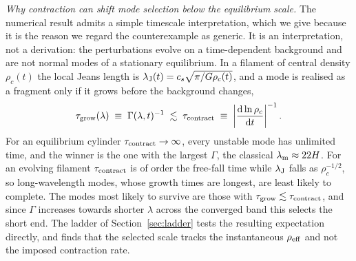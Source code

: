 \documentclass[usenatbib,twoside,twocolumn]{mnras}
\begin{document}
\emph{Why contraction can shift mode selection below the equilibrium scale.} The numerical result admits a simple timescale interpretation, which we give because it is the reason we regard the counterexample as generic. It is an interpretation, not a derivation: the perturbations evolve on a time-dependent background and are not normal modes of a stationary equilibrium. In a filament of central density $\rho_c(t)$ the local Jeans length is $\lambda_{\rm J}(t)=c_s\sqrt{\pi/G\rho_c(t)}$, and a mode is realised as a fragment only if it grows before the background changes,
\begin{equation}
\tau_{\rm grow}(\lambda)\;\equiv\;\Gamma(\lambda,t)^{-1}\;\lesssim\;\tau_{\rm contract}\;\equiv\;\left|\frac{{\rm d}\ln\rho_c}{{\rm d}t}\right|^{-1}.
\label{eq:freezeout}
\end{equation}
For an equilibrium cylinder $\tau_{\rm contract}\to\infty$, every unstable mode has unlimited time, and the winner is the one with the largest $\Gamma$, the classical $\lambda_{\rm m}\approx22H$. For an evolving filament $\tau_{\rm contract}$ is of order the free-fall time while $\lambda_{\rm J}$ falls as $\rho_c^{-1/2}$, so long-wavelength modes, whose growth times are longest, are least likely to complete. The modes most likely to survive are those with $\tau_{\rm grow}\lesssim\tau_{\rm contract}$, and since $\Gamma$ increases towards shorter $\lambda$ across the converged band this selects the short end. The ladder of Section~\ref{sec:ladder} tests the resulting expectation directly, and finds that the selected scale tracks the instantaneous $\rho_{\rm eff}$  and not the imposed contraction rate.






\bsp
\label{lastpage}
\end{document}
